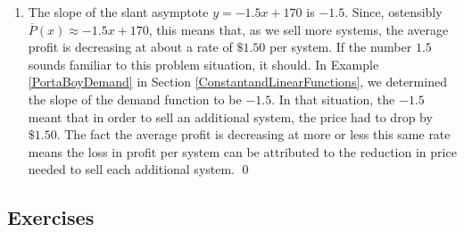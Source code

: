 \begin{ex}
\begin{enumerate}
\item The slope of the slant asymptote $y = -1.5x+170$ is $-1.5$.  Since, ostensibly $\overline{P}(x) \approx -1.5 x + 170$, this means that, as we sell more systems, the average profit is decreasing at about a rate of $\$ 1.50$ per system.  If the number $1.5$ sounds familiar to this problem situation, it should.  In Example \ref{PortaBoyDemand} in Section \ref{ConstantandLinearFunctions}, we determined the slope of the demand function to be $-1.5$. In that situation, the $-1.5$ meant that in order to sell an additional system, the price had to drop by $\$ 1.50$.  The fact the average profit is decreasing at more or less this same rate means the loss in profit per system can be attributed to the reduction in price needed to sell each additional system.
 \qed

\end{enumerate}

\end{ex}

\clearpage

\subsection{Exercises}



\closegraphsfile